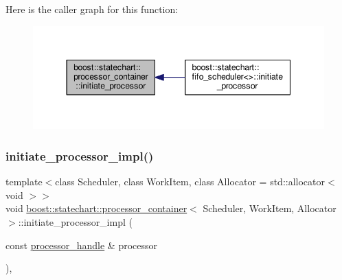 Here is the caller graph for this function\+:
\nopagebreak
\begin{figure}[H]
\begin{center}
\leavevmode
\includegraphics[width=344pt]{classboost_1_1statechart_1_1processor__container_a605121c8af1bd1ab65cb65531da0cac8_icgraph}
\end{center}
\end{figure}
\mbox{\label{classboost_1_1statechart_1_1processor__container_a990121e1344fde3e2b3735c7364805f9}} 
\subsubsection{\texorpdfstring{initiate\+\_\+processor\+\_\+impl()}{initiate\_processor\_impl()}}
{\footnotesize\ttfamily template$<$class Scheduler, class Work\+Item, class Allocator = std\+::allocator$<$ void $>$$>$ \\
void \mbox{\hyperlink{classboost_1_1statechart_1_1processor__container}{boost\+::statechart\+::processor\+\_\+container}}$<$ Scheduler, Work\+Item, Allocator $>$\+::initiate\+\_\+processor\+\_\+impl (\begin{DoxyParamCaption}\item[{const \mbox{\hyperlink{classboost_1_1statechart_1_1processor__container_a82ebbffaed81d7b99119ae0e892f6411}{processor\+\_\+handle}} \&}]{processor }\end{DoxyParamCaption})\hspace{0.3cm}{\ttfamily [inline]}, {\ttfamily [private]}}

